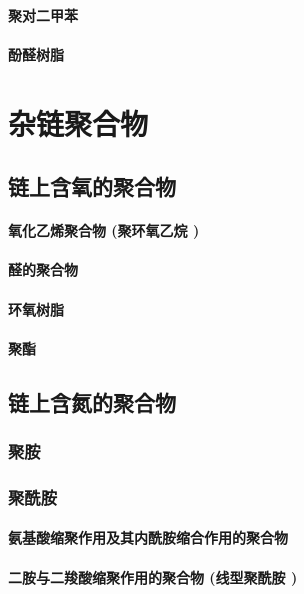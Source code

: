 \documentclass[UTF8]{../03-Chemistry}
\begin{document}
    \subsubsection{聚对二甲苯}
    \subsubsection{酚醛树脂}







\chapter{杂链聚合物}
\section{链上含氧的聚合物}
    \subsubsection{氧化乙烯聚合物 (聚环氧乙烷 )}
    \subsubsection{醛的聚合物}
    \subsubsection{环氧树脂}
    \subsubsection{聚酯}
\section{链上含氮的聚合物}
    \subsection{聚胺}
    \subsection{聚酰胺}
        \subsubsection{氨基酸缩聚作用及其内酰胺缩合作用的聚合物}
        \subsubsection{二胺与二羧酸缩聚作用的聚合物 (线型聚酰胺 )}
\end{document}
